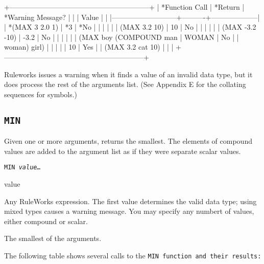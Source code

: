 +-----------------------------------------------------------+
| *Function Call           | *Return | *Warning Message? |
|                           |   Value  |                    |
|---------------------------+----------+--------------------|
| *(MAX 3 2.0 1)           | *3      | *No               |
|                           |          |                    |
|   (MAX 3.2 10)            |   10     |   No               |
|                           |          |                    |
|   (MAX -3.2 -10)          |   -3.2   |   No               |
|                           |          |                    |
|   (MAX boy (COMPOUND man  |   WOMAN  |   No               |
|   woman) girl)            |          |                    |
|                           |   10     |   Yes              |
|   (MAX 3.2 cat 10)        |          |                    |
+-----------------------------------------------------------+

\begin{note}
  Ruleworks issues a warning when it finds a value of an invalid data
  type, but it does process the rest of the arguments list. (See
  Appendix E for the collating sequences for symbols.)
\end{note}

\subsection{\tt{MIN}}

Given one or more arguments, returns the smallest. The elements of
compound values are added to the argument list as if they were
separate scalar values.

\Format

\tt{MIN} \it{value}\ldots

\begin{arguments}
\item[value]

  Any RuleWorks expression. The first value determines the valid data
  type; using mixed types causes a warning message.  You may specify
  any numbert of values, either compound or scalar.
\end{arguments}

\ReturnValue

The smallest of the arguments.

\Example

The following table shows several calls to the \tt{MIN} function and their
results:

